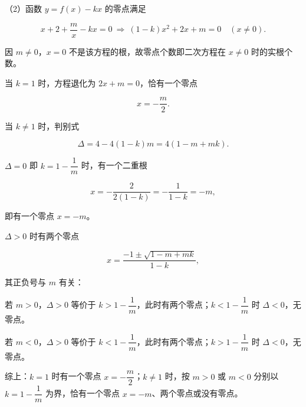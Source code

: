 \begin{answer}
（2）函数 $y=f(x)-kx$ 的零点满足

\nopagebreak[4]
\[x+2+\frac mx-kx=0\ \Longrightarrow\ (1-k)x^2+2x+m=0\quad(x\neq0).\]

因 $m\neq0$，$x=0$ 不是该方程的根，故零点个数即二次方程在 $x\neq0$ 时的实根个数。

当 $k=1$ 时，方程退化为 $2x+m=0$，恰有一个零点

\nopagebreak[4]
\[x=-\frac m2.\]

当 $k\neq1$ 时，判别式

\nopagebreak[4]
\[\Delta=4-4(1-k)m=4(1-m+mk).\]

$\Delta=0$ 即 $k=1-\dfrac1m$ 时，有一个二重根

\nopagebreak[4]
\[x=-\frac{2}{2(1-k)}=-\frac{1}{1-k}=-m,\]

即有一个零点 $x=-m$。

$\Delta>0$ 时有两个零点

\nopagebreak[4]
\[x=\frac{-1\pm\sqrt{1-m+mk}}{1-k},\]

其正负号与 $m$ 有关：

若 $m>0$，$\Delta>0$ 等价于 $k>1-\dfrac1m$，此时有两个零点；$k<1-\dfrac1m$ 时 $\Delta<0$，无零点。

若 $m<0$，$\Delta>0$ 等价于 $k<1-\dfrac1m$，此时有两个零点；$k>1-\dfrac1m$ 时 $\Delta<0$，无零点。

综上：$k=1$ 时有一个零点 $x=-\dfrac m2$；$k\neq1$ 时，按 $m>0$ 或 $m<0$ 分别以 $k=1-\dfrac1m$ 为界，恰有一个零点 $x=-m$、两个零点或没有零点。


\end{answer}